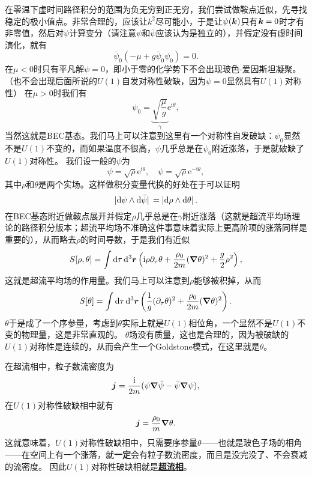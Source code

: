 \documentclass[hyperref, UTF8, a4paper]{ctexart}
\newcommand*{\ii}{\mathrm{i}}
\newcommand*{\ee}{\mathrm{e}}
\newcommand{\concept}[1]{\underline{\textbf{#1}}}
\renewcommand{\emph}{\textbf}
\begin{document}
在零温下虚时间路径积分的范围为负无穷到正无穷，我们尝试做鞍点近似，先寻找稳定的极小值点。非常合理的，应该让$k^2$尽可能小，于是让$\psi(\vb*{k})$只有$\vb*{k}=0$时才有非零值，然后对$\psi$计算变分（请注意$\psi$和$\bar{\psi}$应该认为是独立的），并假定没有虚时间演化，就有
\[
    \bar{\psi}_0 \left( - \mu + g \bar{\psi}_0 \psi_0 \right) = 0.
\]
在$\mu < 0$时只有平凡解$\psi=0$，即小于零的化学势下不会出现玻色-爱因斯坦凝聚。（也不会出现后面所说的$U(1)$自发对称性破缺，因为$\psi=0$显然具有$U(1)$对称性）
在$\mu > 0$时我们有
\begin{equation}
    \psi_0 = \underbrace{\sqrt{\frac{\mu}{g}}}_{\gamma} \ee^{\ii \theta},
\end{equation}
当然这就是BEC基态。我们马上可以注意到这里有一个对称性自发破缺：$\psi_0$显然不是$U(1)$不变的，而如果温度不很高，$\psi$几乎总是在$\psi_0$附近涨落，于是就破缺了$U(1)$对称性。
我们设一般的$\psi$为
\begin{equation}
    \psi = \sqrt{\rho} \ee^{\ii \theta}, \quad \psi = \sqrt{\rho} \ee^{- \ii \theta},
\end{equation}
其中$\rho$和$\theta$是两个实场。这样做积分变量代换的好处在于可以证明
\[
    \abs*{\dd{\psi} \wedge \dd{\bar{\psi}}} = \abs*{\dd{\rho} \wedge \dd{\theta}}.
\]
在BEC基态附近做鞍点展开并假定$\rho$几乎总是在$\gamma$附近涨落（这就是超流平均场理论的路径积分版本；超流平均场不准确这件事意味着实际上更高阶项的涨落同样是重要的），从而略去$\rho$的时间导数，于是我们有近似
\begin{equation}
    S[\rho, \theta] = \int \dd{\tau} \dd[3]{\vb*{r}} \left( \ii \rho \partial_\tau \theta + \frac{\rho_0}{2m} (\grad{\theta})^2 + \frac{g}{2} \rho^2 \right),
\end{equation}
这就是超流平均场的作用量。我们马上可以注意到$\rho$能够被积掉，从而
\begin{equation}
    S[\theta] = \int \dd{\tau} \dd[3]{\vb*{r}} \left( \frac{1}{g} (\partial_\tau \theta)^2 + \frac{\rho_0}{2m} (\grad{\theta})^2 \right).
\end{equation}
$\theta$于是成了一个序参量，考虑到$\theta$实际上就是$U(1)$相位角，一个显然不是$U(1)$不变的物理量，这是非常直观的。
$\theta$场没有质量，这也是合理的，因为被破缺的$U(1)$对称性是连续的，从而会产生一个Goldstone模式，在这里就是$\theta$。

在超流相中，粒子数流密度为
\[
    \vb*{j} = \frac{\ii}{2m} ( \psi \grad{\bar{\psi}} - \bar{\psi} \grad{\psi} ),
\]
在$U(1)$对称性破缺相中就有
\begin{equation}
    \vb*{j} = \frac{\rho_0}{m} \grad{\theta}.
\end{equation}
这就意味着，$U(1)$对称性破缺相中，只需要序参量$\theta$——也就是玻色子场的相角——在空间上有一个涨落，就\emph{一定}会有粒子数流密度，而且是没完没了、不会衰减的流密度。
因此$U(1)$对称性破缺相就是\concept{超流相}。
\end{document}
